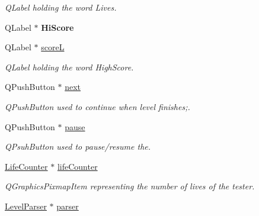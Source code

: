 \begin{DoxyCompactItemize}
\begin{DoxyCompactList}\small\item\em Q\-Label holding the word Lives. \end{DoxyCompactList}\item 
\hypertarget{classGame2Scene_a7c2efee96429b9740203607dd7a40881}{Q\-Label $\ast$ {\bfseries Hi\-Score}}\label{classGame2Scene_a7c2efee96429b9740203607dd7a40881}

\item 
Q\-Label $\ast$ \hyperlink{classGame2Scene_ac135ec60d1ac545091a8a562df7e99cb}{score\-L}
\begin{DoxyCompactList}\small\item\em Q\-Label holding the word High\-Score. \end{DoxyCompactList}\item 
\hypertarget{classGame2Scene_aaa90ff637eec7f19523cf4debaed736d}{Q\-Push\-Button $\ast$ \hyperlink{classGame2Scene_aaa90ff637eec7f19523cf4debaed736d}{next}}\label{classGame2Scene_aaa90ff637eec7f19523cf4debaed736d}

\begin{DoxyCompactList}\small\item\em Q\-Push\-Button used to continue when level finishes;. \end{DoxyCompactList}\item 
\hypertarget{classGame2Scene_a08e755f5197834f770f07e86c6b5bbe4}{Q\-Push\-Button $\ast$ \hyperlink{classGame2Scene_a08e755f5197834f770f07e86c6b5bbe4}{pause}}\label{classGame2Scene_a08e755f5197834f770f07e86c6b5bbe4}

\begin{DoxyCompactList}\small\item\em Q\-Psuh\-Button used to pause/resume the. \end{DoxyCompactList}\item 
\hypertarget{classGame2Scene_a93036a156e84a8e5b56f0c66b634eed8}{\hyperlink{classLifeCounter}{Life\-Counter} $\ast$ \hyperlink{classGame2Scene_a93036a156e84a8e5b56f0c66b634eed8}{life\-Counter}}\label{classGame2Scene_a93036a156e84a8e5b56f0c66b634eed8}

\begin{DoxyCompactList}\small\item\em Q\-Graphics\-Pixmap\-Item representing the number of lives of the tester. \end{DoxyCompactList}\item 
\hypertarget{classGame2Scene_a8c8614db63839edac62c5bf35814a5c8}{\hyperlink{classLevelParser}{Level\-Parser} $\ast$ \hyperlink{classGame2Scene_a8c8614db63839edac62c5bf35814a5c8}{parser}}\label{classGame2Scene_a8c8614db63839edac62c5bf35814a5c8}


\end{DoxyCompactItemize}
